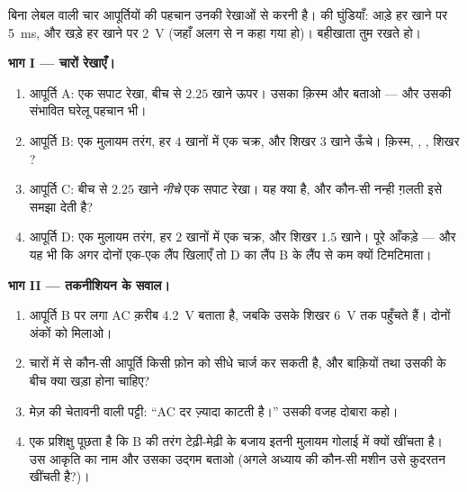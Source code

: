 \begin{problem}\label{pb:g9:alternating-current:1}
बिना लेबल वाली चार आपूर्तियों की पहचान उनकी रेखाओं से करनी है।
 की घुंडियाँ: आड़े हर खाने पर \qty{5}{ms}, और खड़े हर खाने पर
\qty{2}{V} (जहाँ अलग से न कहा गया हो)। बहीखाता तुम रखते हो।

\medskip\noindent\textbf{भाग I --- चारों रेखाएँ।}
\begin{enumerate}
  \item आपूर्ति A: एक सपाट रेखा, बीच से $2.25$ खाने ऊपर। उसका क़िस्म
        और  बताओ --- और उसकी संभावित घरेलू पहचान भी।
  \item आपूर्ति B: एक मुलायम तरंग, हर $4$ खानों में एक चक्र, और शिखर
        $3$ खाने ऊँचे। क़िस्म, , , शिखर ?
  \item आपूर्ति C: बीच से $2.25$ खाने \emph{नीचे} एक सपाट रेखा। यह
        क्या है, और कौन-सी नन्ही ग़लती इसे समझा देती है?
  \item आपूर्ति D: एक मुलायम तरंग, हर $2$ खानों में एक चक्र, और शिखर
        $1.5$ खाने। पूरे आँकड़े --- और यह भी कि अगर दोनों एक-एक लैंप
        खिलाएँ तो D का लैंप B के लैंप से कम क्यों टिमटिमाता।
\end{enumerate}

\medskip\noindent\textbf{भाग II --- तकनीशियन के सवाल।}
\begin{enumerate}[resume]
  \item आपूर्ति B पर लगा AC  क़रीब \qty{4.2}{V} बताता है,
        जबकि उसके शिखर \qty{6}{V} तक पहुँचते हैं। दोनों अंकों को
        मिलाओ।
  \item चारों में से कौन-सी आपूर्ति किसी फ़ोन को सीधे चार्ज कर सकती
        है, और बाक़ियों तथा उसकी  के बीच क्या खड़ा होना चाहिए?
  \item मेज़ की चेतावनी वाली पट्टी: ``AC  दर  ज़्यादा
        काटती है।'' उसकी वजह दोबारा कहो।
  \item एक प्रशिक्षु पूछता है कि  B की तरंग टेढ़ी-मेढ़ी के
        बजाय इतनी मुलायम गोलाई में क्यों खींचता है। उस आकृति का नाम
        और उसका उद्गम बताओ (अगले अध्याय की कौन-सी मशीन उसे क़ुदरतन
        खींचती है?)।
\end{enumerate}


\end{problem}
